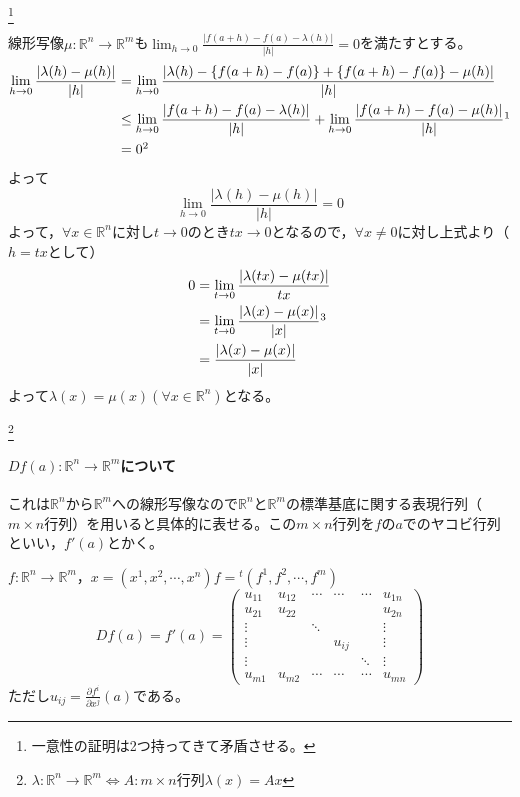 \documentclass[dvipdfmx,a4j,10pt]{jsarticle}
\makeatletter
\theoremstyle{mystyle1}
\theoremstyle{mystyle2}
\renewenvironment{proof}[1][\proofname]{\par
  \pushQED{\qed}%
  \normalfont
  \topsep6\p@\@plus6\p@ \trivlist
  \item[\hskip\labelsep{\bfseries\sffamily #1}]\ignorespaces
}{%
  \popQED\endtrivlist\@endpefalse
}
\renewcommand\proofname{証明}
\makeatother
\begin{document}
\footnote{一意性の証明は2つ持ってきて矛盾させる。}

\begin{proof}
	線形写像$\mu:\mathbb{R}^n\to\mathbb{R}^m$も$\displaystyle \lim_{h\to 0}\frac{|f(a+h)-f(a)-\lambda(h)|}{|h|}=0$を満たすとする。
	\[
	\begin{split}
	\lim_{h\to 0}\frac{|\lambda(h)-\mu(h)|}{|h|}
	&= \lim_{h\to0}\frac{|\lambda(h)-\{f(a+h)-f(a)\}+\{f(a+h)-f(a)\}-\mu(h)|}{|h|}\\
	&\leq\lim_{h\to0}\frac{|f(a+h)-f(a)-\lambda(h)|}{|h|}+\lim_{h\to0}\frac{|f(a+h)-f(a)-\mu(h)|}{|h|}\footnotemark\\
	&= 0\footnotemark
	\end{split}
	\]
	よって
	\[
	\lim_{h\to0}\frac{|\lambda(h)-\mu(h)|}{|h|}=0
	\]
	よって，$\forall x\in\mathbb{R}^n$に対し$t\to0$のとき$tx\to0$となるので，$\forall x\neq0$に対し上式より（$h=tx$として）
	\[
	\begin{split}
	0 &=\lim_{t\to0}\frac{|\lambda(tx)-\mu(tx)|}{tx}\\
	&= \lim_{t\to0}\frac{|\lambda(x)-\mu(x)|}{|x|}\footnotemark\\
	&= \frac{|\lambda(x)-\mu(x)|}{|x|}
	\end{split}
	\]
	よって$\lambda(x)=\mu(x)$$(\forall x\in\mathbb{R}^n)$となる。
\end{proof}

\footnote{$\lambda:\mathbb{R}^n\to\mathbb{R}^m\Leftrightarrow A:m\times n$行列$\lambda(x)=Ax$}

\newpage

\paragraph{$Df(a):\mathbb{R}^n\to\mathbb{R}^m$について}
これは$\mathbb{R}^n$から$\mathbb{R}^m$への線形写像なので$\mathbb{R}^n$と$\mathbb{R}^m$の標準基底に関する表現行列（$m\times n$行列）を用いると具体的に表せる。この$m\times n$行列を$f$の$a$でのヤコビ行列といい，$f'(a)$とかく。

$f:\mathbb{R}^n\to\mathbb{R}^m$，$x=(x^1,x^2,\cdots,x^n)$$f={}^{t}(f^1,f^2,\cdots,f^m)$
\[
Df(a)=f'(a)=
\begin{pmatrix}
u_{11} & u_{12} & \cdots & \cdots & \cdots & u_{1n}\\
u_{21} & u_{22} &        &        &        & u_{2n} \\
\vdots &        & \ddots &        &        & \vdots \\
\vdots &        &        & u_{ij} &        & \vdots \\
\vdots &        &        &        & \ddots & \vdots \\
u_{m1} & u_{m2} & \cdots & \cdots & \cdots & u_{mn}
\end{pmatrix}
\]
ただし$\displaystyle u_{ij}=\frac{\partial f^i}{\partial x^j}(a)$である。
\end{document}
